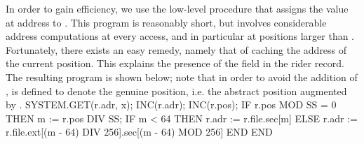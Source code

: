 \noindent In order to gain efficiency, we use the low-level procedure  that assigns the value at address  to . This program is reasonably short, but involves considerable address computations at every access, and in particular at positions larger than . Fortunately, there exists an easy remedy, namely that of caching the address of the current position. This explains the presence of the field  in the rider record. The resulting program is shown below; note that in order to avoid the addition of ,  is defined to denote the genuine position, i.e. the abstract position augmented by .
\begintt
SYSTEM.GET(r.adr, x); INC(r.adr); INC(r.pos); IF r.pos MOD SS = 0 THEN
m := r.pos DIV SS;
IF m < 64 THEN r.adr := r.file.sec[m]
ELSE r.adr := r.file.ext[(m - 64) DIV 256].sec[(m - 64) MOD 256] END
END
\endtt

